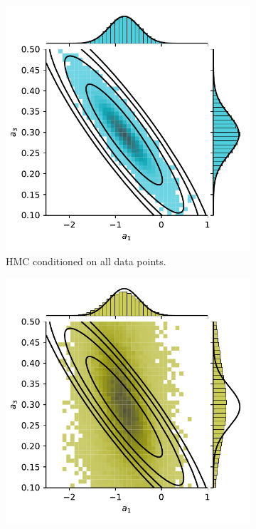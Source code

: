 \begin{figure}[htbp]
    \centering
    \begin{subfigure}[b]{0.45\linewidth}
        \centering
        \includegraphics[width=\linewidth]{Figures/simulated_joint_HMC_15.pdf} 
        \caption{HMC conditioned on all data points.}
    \end{subfigure}
    \begin{subfigure}[b]{0.45\linewidth}
        \centering
        \includegraphics[width=\linewidth]{Figures/simulated_joint_HMC_5.pdf} 

\end{subfigure}
\end{figure}
